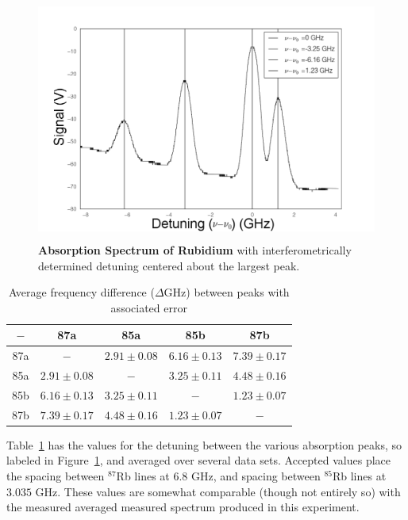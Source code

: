 \documentclass[paper=a4, fontsize=11pt]{scrartcl} %
\numberwithin{equation}{section}
\numberwithin{figure}{section}
\numberwithin{table}{section}
\begin{document}
\begin{figure}[h] \begin{center}
  \includegraphics[height=80mm]{Detuning.png}
  \caption{\textbf{Absorption Spectrum of Rubidium } with
      interferometrically determined detuning centered about the largest peak. }
  \label{fig:detuning}
\end{center} \end{figure}

\begin{table}[h]
\centering
\caption{Average frequency difference ($\Delta$GHz) between peaks with associated error}
\begin{tabular}{ || c | c c c c || }
  \hline
  \hline
   $-$ & 87a & 85a & 85b & 87b \\
  \hline
  87a & $-$ & $2.91 \pm 0.08$ & $6.16 \pm 0.13$ & $7.39 \pm 0.17$ \\
  85a & $2.91 \pm 0.08$ & $-$ & $3.25 \pm 0.11$ & $4.48 \pm 0.16$ \\
  85b & $6.16 \pm 0.13$ & $3.25 \pm 0.11$ & $-$ &  $1.23 \pm 0.07$ \\
  87b & $7.39 \pm 0.17$ & $4.48 \pm 0.16$ & $1.23 \pm 0.07$ & $-$  \\
  \hline
  \hline
\end{tabular}
\label{table:freqOffset}
\end{table}

Table~\ref{table:freqOffset} has the values for the detuning between
the various absorption peaks, so labeled in Figure~\ref{fig:detuning},
and averaged over several data sets. Accepted values place the spacing between $^{87}$Rb lines at $6.8$ GHz, and spacing between $^{85}$Rb lines at $3.035$ GHz. These values are somewhat comparable (though not entirely so) with the measured averaged measured spectrum produced in this experiment.
\end{document}

